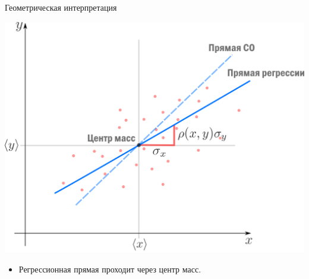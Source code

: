 \documentclass[9pt]{beamer}
\begin{document}
\begin{frame}{Геометрическая интерпретация}
\begin{center}
    \includegraphics[height=0.5\textheight]{img/linear_regression_geometric_interpretation.png}
\end{center}
\begin{itemize}
    \item Регрессионная прямая проходит через центр масс.
\end{itemize}
\end{frame}
\end{document}
